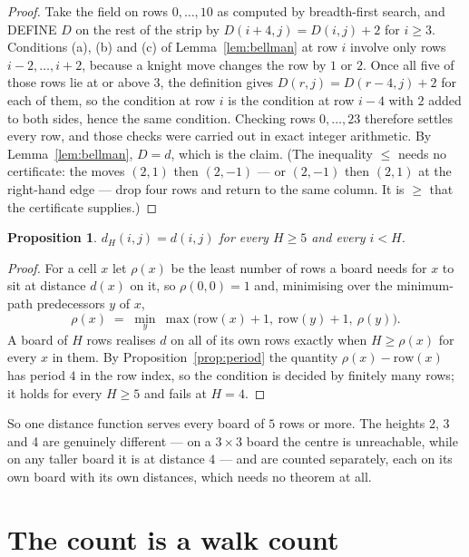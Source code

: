 \documentclass[11pt,a4paper]{article}
\theoremstyle{plain}
\newtheorem{proposition}[theorem]{Proposition}
\theoremstyle{definition}
\begin{document}
\begin{proof}
Take the field on rows $0,\dots,10$ as computed by breadth-first search, and DEFINE $D$ on the rest of the strip by $D(i+4,j)=D(i,j)+2$ for $i\ge3$. Conditions (a), (b) and (c) of Lemma~\ref{lem:bellman} at row $i$ involve only rows $i-2,\dots,i+2$, because a knight move changes the row by $1$ or $2$. Once all five of those rows lie at or above $3$, the definition gives $D(r,j)=D(r-4,j)+2$ for each of them, so the condition at row $i$ is the condition at row $i-4$ with $2$ added to both sides, hence the same condition. Checking rows $0,\dots,23$ therefore settles every row, and those checks were carried out in exact integer arithmetic. By Lemma~\ref{lem:bellman}, $D=d$, which is the claim. (The inequality $\le$ needs no certificate: the moves $(2,1)$ then $(2,-1)$ --- or $(2,-1)$ then $(2,1)$ at the right-hand edge --- drop four rows and return to the same column. It is $\ge$ that the certificate supplies.)
\end{proof}

\begin{proposition}\label{prop:height}
$d_H(i,j)=d(i,j)$ for every $H\ge5$ and every $i<H$.
\end{proposition}

\begin{proof}
For a cell $x$ let $\rho(x)$ be the least number of rows a board needs for $x$ to sit at distance $d(x)$ on it, so $\rho(0,0)=1$ and, minimising over the minimum-path predecessors $y$ of $x$,
\[ \rho(x)\;=\;\min_y\ \max\bigl(\mathrm{row}(x)+1,\ \mathrm{row}(y)+1,\ \rho(y)\bigr). \]
A board of $H$ rows realises $d$ on all of its own rows exactly when $H\ge\rho(x)$ for every $x$ in them. By Proposition~\ref{prop:period} the quantity $\rho(x)-\mathrm{row}(x)$ has period $4$ in the row index, so the condition is decided by finitely many rows; it holds for every $H\ge5$ and fails at $H=4$.
\end{proof}

So one distance function serves every board of $5$ rows or more. The heights 2, 3 and 4 are genuinely different --- on a $3\times3$ board the centre is unreachable, while on any taller board it is at distance $4$ --- and are counted separately, each on its own board with its own distances, which needs no theorem at all.

\section{The count is a walk count}
\end{document}
